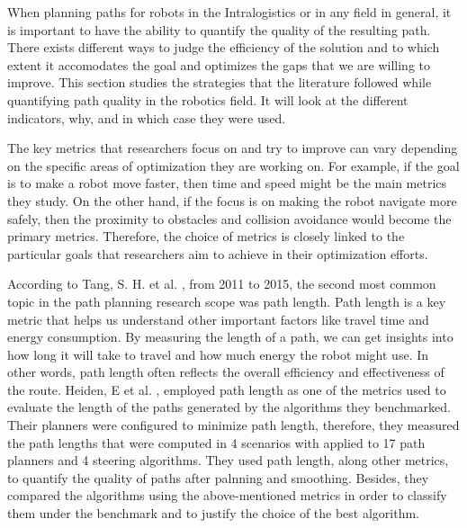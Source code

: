 When planning paths for robots in the Intralogistics or in any field in general, it is important to have the ability 
to quantify the quality of the resulting path. There exists different ways to judge the efficiency of the solution
and to which extent it accomodates the goal and optimizes the gaps that we are willing to improve.
This section studies the strategies that the literature followed while quantifying path quality in the robotics
field. It will look at the different indicators, why, and in which case they were used. 

The key metrics that researchers focus on and try to improve can vary depending on the specific areas of 
optimization they are working on. For example, if the goal is to make a robot move faster, then time 
and speed might be the main metrics they study. On the other hand, if the focus is on making the robot 
navigate more safely, then the proximity to obstacles and collision avoidance would become the primary 
metrics. Therefore, the choice of metrics is closely linked to the particular goals that researchers 
aim to achieve in their optimization efforts.

According to Tang, S. H. et al. \cite{R20}, from 2011 to 2015, the second most common topic in the path 
planning research scope was path length. Path length is a key metric that helps us understand other 
important factors like travel time and energy consumption. By measuring the length of a path, we 
can get insights into how long it will take to travel and how much energy the robot might use. 
In other words, path length often reflects the overall efficiency and effectiveness of the route. 
Heiden, E et al. \cite{R23}, employed path length as one of the metrics used to evaluate the length of 
the paths generated by the algorithms they benchmarked. Their planners 
were configured to minimize path length, therefore, they measured the path lengths that were computed 
in 4 scenarios with applied to 17 path planners and 4 steering algorithms. They used path length,
along other metrics, to quantify the quality of paths after palnning and smoothing.
Besides, they compared the algorithms using the above-mentioned metrics in order to classify them
under the benchmark and to justify the choice of the best algorithm.  

